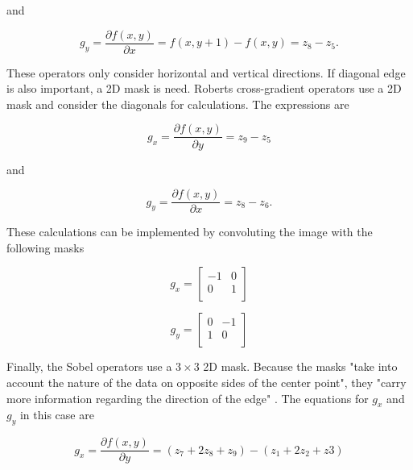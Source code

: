 and

\begin{equation}
    \label{eq:gradient_operators_y}
    g_y = \frac{\partial f(x,y)}{\partial x} = f(x,y+1)-f(x,y) = z_8 - z_5.
\end{equation}

These operators only consider horizontal and vertical directions. If diagonal edge is also important, a 2D mask is need. Roberts cross-gradient operators use a 2D mask and consider the diagonals for calculations. The expressions are \cite{Gonzalez2008_digital_image_processing}

\begin{equation}
    \label{eq:roberts_operators_x}
    g_x = \frac{\partial f(x,y)}{\partial y} = z_9 - z_5
\end{equation}

and

\begin{equation}
    \label{eq:roberts_operators_y}
    g_y = \frac{\partial f(x,y)}{\partial x} = z_8 - z_6.
\end{equation}

These calculations can be implemented by convoluting the image with the following masks

\begin{equation}
    g_x = \begin{bmatrix}
        -1 & 0 \\
        0 & 1 \\
    \end{bmatrix}
\end{equation}

\begin{equation}
    g_y = \begin{bmatrix}
        0 & -1 \\
        1 & 0 \\
    \end{bmatrix}
\end{equation}

Finally, the Sobel operators use a $3\times 3$ 2D mask. Because the masks "take into account the nature of the data on opposite sides of the center point", they "carry more information regarding the direction of the edge" \cite{Gonzalez2008_digital_image_processing}. The equations for $g_x$ and $g_y$ in this case are

\begin{equation}
    \label{eq:roberts_operators_x}
    g_x = \frac{\partial f(x,y)}{\partial y} = (z_7 + 2z_8 + z_9) - (z_1 + 2z_2 + z3)
\end{equation}

